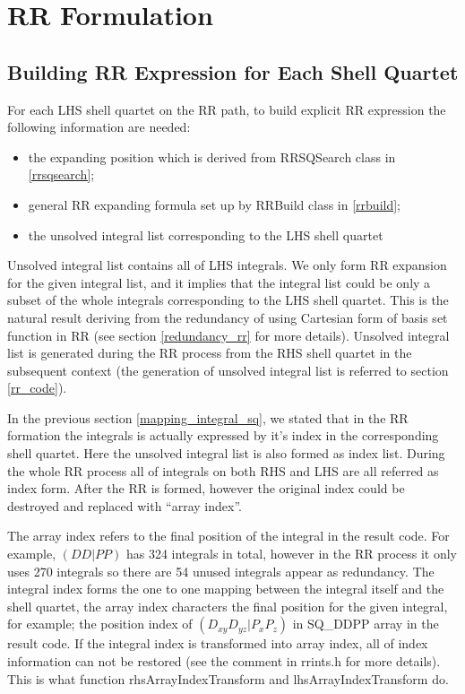 \section{RR Formulation}

\subsection{Building RR Expression for Each Shell Quartet}
%
%
%
For each LHS shell quartet on the RR path, to build explicit RR expression
the following information are needed:
\begin{itemize}
 \item the expanding position which is derived from RRSQSearch class in 
 \ref{rrsqsearch};
 \item general RR expanding formula set up by RRBuild class in \ref{rrbuild};
 \item the unsolved integral list corresponding to the LHS shell quartet 
\end{itemize}
Unsolved integral list contains all of LHS integrals. We only form RR expansion
for the given integral list, and it implies that the integral list could be 
only a subset of the whole integrals corresponding to the LHS shell quartet.
This is the natural result deriving from the redundancy of using Cartesian
form of basis set function in RR (see section \ref{redundancy_rr} for more
details). Unsolved integral list is generated during the RR process from
the RHS shell quartet in the subsequent context (the generation of unsolved
integral list is referred to section \ref{rr_code}).

In the previous section \ref{mapping_integral_sq}, we stated that
in the RR formation the integrals is actually expressed by it's index
in the corresponding shell quartet. Here the unsolved integral list
is also formed as index list. During the whole RR process all of integrals
on both RHS and LHS are all referred as index form. After the RR is formed,
however the original index could be destroyed and replaced with ``array index''.

The array index refers to the final position of the integral in the result
code. For example, $(DD|PP)$ has 324 integrals in total, however in the RR
process it only uses 270 integrals so there are 54 unused integrals appear
as redundancy. The integral index forms the one to one mapping between  
the integral itself and the shell quartet, the array index characters the 
final position for the given integral, for example; the position index of 
$(D_{xy}D_{yz}|P_{x}P_{z})$ in SQ\_DDPP array in the result code. If the 
integral index is transformed into array index, all of index information
can not be restored (see the comment in rrints.h for more details). This 
is what function rhsArrayIndexTransform and lhsArrayIndexTransform do.

